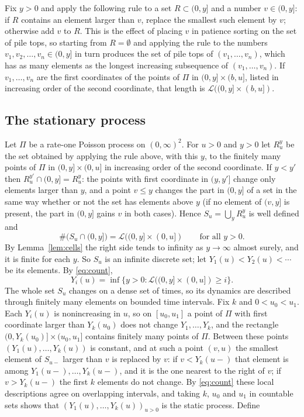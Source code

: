 \documentclass[11pt]{amsart}
\theoremstyle{remark}
\numberwithin{equation}{section}
\begin{document}
Fix $y>0$ and apply the following rule to a set $R\subset(0,y]$ and a number $v\in(0,y]$: if $R$ contains an element larger than $v$, replace the smallest such element by $v$; otherwise add $v$ to $R$. This is the effect of placing $v$ in patience sorting on the set of pile tops, so starting from $R=\emptyset$ and applying the rule to the numbers $v_1,v_2,\dots,v_n\in(0,y]$ in turn produces the set of pile tops of $(v_1,\dots,v_n)$, which has as many elements as the longest increasing subsequence of $(v_1,\dots,v_n)$. If $v_1,\dots,v_n$ are the first coordinates of the points of $\Pi$ in $(0,y]\times(b,u]$, listed in increasing order of the second coordinate, that length is $\mathcal L((0,y]\times(b,u])$.

\subsection{The stationary process}
Let $\Pi$ be a rate-one Poisson process on $(0,\infty)^2$. For $u>0$ and $y>0$ let $R^y_u$ be the set obtained by applying the rule above, with this $y$, to the finitely many points of $\Pi$ in $(0,y]\times(0,u]$ in increasing order of the second coordinate. If $y<y'$ then $R^{y'}_u\cap(0,y]=R^y_u$: the points with first coordinate in $(y,y']$ change only elements larger than $y$, and a point $v\le y$ changes the part in $(0,y]$ of a set in the same way whether or not the set has elements above $y$ (if no element of $(v,y]$ is present, the part in $(0,y]$ gains $v$ in both cases). Hence $S_u=\bigcup_yR^y_u$ is well defined and
\begin{equation}\label{eq:count}
\#\bigl(S_u\cap(0,y]\bigr)=\mathcal L((0,y]\times(0,u])\qquad\text{for all }y>0 .
\end{equation}
By Lemma~\ref{lem:cells} the right side tends to infinity as $y\to\infty$ almost surely, and it is finite for each $y$. So $S_u$ is an infinite discrete set; let $Y_1(u)<Y_2(u)<\cdots$ be its elements. By \eqref{eq:count},
\begin{equation}\label{eq:Yi}
Y_i(u)=\inf\{y>0:\mathcal L((0,y]\times(0,u])\ge i\}.
\end{equation}
The whole set $S_u$ changes on a dense set of times, so its dynamics are described through finitely many elements on bounded time intervals. Fix $k$ and $0<u_0<u_1$. Each $Y_i(u)$ is nonincreasing in $u$, so on $[u_0,u_1]$ a point of $\Pi$ with first coordinate larger than $Y_k(u_0)$ does not change $Y_1,\dots,Y_k$, and the rectangle $(0,Y_k(u_0)]\times(u_0,u_1]$ contains finitely many points of $\Pi$. Between these points $(Y_1(u),\dots,Y_k(u))$ is constant, and at such a point $(v,u)$ the smallest element of $S_{u-}$ larger than $v$ is replaced by $v$: if $v<Y_k(u-)$ that element is among $Y_1(u-),\dots,Y_k(u-)$, and it is the one nearest to the right of $v$; if $v>Y_k(u-)$ the first $k$ elements do not change. By \eqref{eq:count} these local descriptions agree on overlapping intervals, and taking $k$, $u_0$ and $u_1$ in countable sets shows that $(Y_1(u),\dots,Y_k(u))_{u>0}$ is the static process. Define
\end{document}
